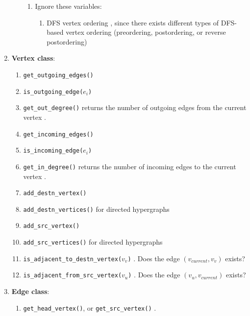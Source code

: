 \begin{enumerate}
\begin{enumerate}
\begin{enumerate}
		\item Ignore these variables: \vspace{-0.1cm}
			\begin{enumerate} \itemsep -1pt
			\item DFS vertex ordering \cite[\S53, pp. 857]{Goldman2008}, since there exists different types of DFS-based vertex ordering (preordering, postordering, or reverse postordering) \cite{WikipediaContributors2018a51}
			\end{enumerate}
		\end{enumerate}
	\end{enumerate}
\item {\bf Vertex class}: \vspace{-0.3cm}
	\begin{enumerate} \itemsep -2pt
	\item {\tt get\_outgoing\_edges()} \cite[\S52.5, pp. 851]{Goldman2008} \cite[\S14.1.1, pp. 626]{Goodrich2013}
	\item {\tt is\_outgoing\_edge($e_{i}$)}
	\item {\tt get\_out\_degree()} returns the number of outgoing edges from the current vertex \cite[\S14.1.1, pp. 626]{Goodrich2013}.
	\item {\tt get\_incoming\_edges()} \cite[\S52.5, pp. 851]{Goldman2008} \cite[\S14.1.1, pp. 626]{Goodrich2013}
	\item {\tt is\_incoming\_edge($e_{i}$)}
	\item {\tt get\_in\_degree()} returns the number of incoming edges to the current vertex \cite[\S14.1.1, pp. 626]{Goodrich2013}.
	\item {\tt add\_destn\_vertex()}
	\item {\tt add\_destn\_vertices()} for directed hypergraphs
	\item {\tt add\_src\_vertex()}
	\item {\tt add\_src\_vertices()} for directed hypergraphs
	\item {\tt is\_adjacent\_to\_destn\_vertex($v_{v}$)} \cite[\S13.1.1, pp. 599]{Goodrich2011}. Does the edge $(v_{current}, v_{v})$ exists?
	\item {\tt is\_adjacent\_from\_src\_vertex($v_{u}$)} \cite[\S13.1.1, pp. 599]{Goodrich2011}. Does the edge $(v_{u}, v_{current})$ exists?
	\end{enumerate}
\item {\bf Edge class}: \vspace{-0.3cm}
	\begin{enumerate} \itemsep -2pt
	\item {\tt get\_head\_vertex()}, or {\tt get\_src\_vertex()} \cite[\S13.1.1, pp. 599]{Goodrich2011}.

\end{enumerate}
\end{enumerate}
